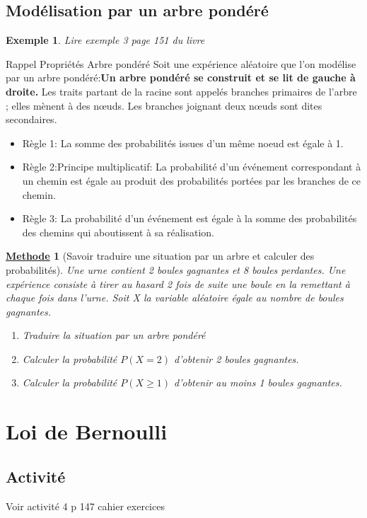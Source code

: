 \documentclass[10pt,a4paper]{article}
\theoremstyle{break}
\newtheorem{Ex}{Exemple}
\newtheorem{Meth}{\underline{Methode}}
\begin{document}
\subsection{Modélisation par un arbre pondéré}
\begin{Ex} 
Lire exemple 3 page 151 du livre
\end{Ex}
	\begin{bclogo}[couleur = red!30,arrondi =0.1,logo =\bcbook]{Rappel Propriétés Arbre pondéré} 
Soit une expérience aléatoire que l'on modélise par un arbre pondéré:\textbf{Un arbre pondéré se construit et se lit de gauche à droite.}
Les traits partant de la racine sont appelés branches primaires de l’arbre ; elles mènent à des nœuds.
Les branches joignant deux nœuds sont dites secondaires.
\begin{itemize}
	\item Règle 1:
	La somme des probabilités issues d’un même noeud est égale à 1.
	\item Règle 2:Principe multiplicatif:
	La probabilité d’un événement correspondant à un chemin est égale au produit des 
	probabilités  portées par les branches de ce chemin.
	\item Règle 3: 
	La probabilité d’un événement est égale à la somme des probabilités des chemins qui aboutissent 
	à sa réalisation.
\end{itemize}

\end{bclogo}
\begin{Meth}[Savoir traduire une situation par un arbre et calculer des probabilités]
	Une urne contient 2 boules gagnantes et 8 boules perdantes. Une expérience consiste à tirer au hasard 2 fois de suite une boule en la remettant à chaque fois dans l’urne.
		Soit X la variable aléatoire égale au nombre de boules gagnantes.
	\begin{enumerate}
		\item Traduire la situation par un arbre pondéré
		\item Calculer la probabilité $P(X=2)$ d’obtenir 2 boules gagnantes.
		\item Calculer la probabilité $P(X\geqslant1)$ d’obtenir au moins 1 boules gagnantes.
	\end{enumerate}
\end{Meth}
\section{Loi de Bernoulli}
\subsection{Activité}
Voir activité 4 p 147 cahier exercices
\end{document}
